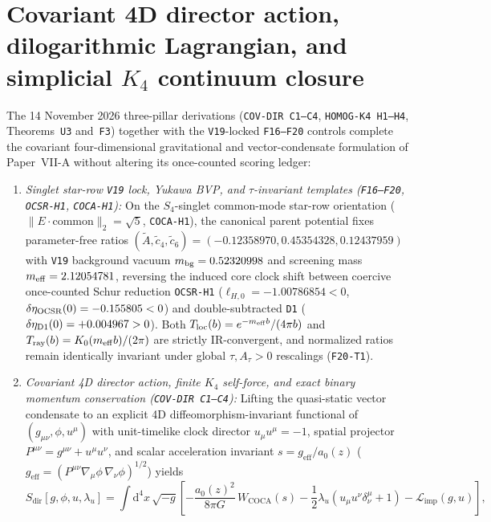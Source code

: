 \documentclass[11pt]{article}
\begin{document}
\section{Covariant 4D director action, dilogarithmic Lagrangian, and simplicial $K_4$ continuum closure}
\label{sec:foundations-f16-f20-papervii-20261112}\hypertarget{f16f20papervii}{}
The 14 November 2026 three-pillar derivations (\texttt{COV-DIR C1--C4}, \texttt{HOMOG-K4 H1--H4}, Theorems~\texttt{U3} and~\texttt{F3}) together with the \texttt{V19}-locked \texttt{F16--F20} controls complete the covariant four-dimensional gravitational and vector-condensate formulation of Paper~VII-A without altering its once-counted scoring ledger:
\begin{enumerate}
\item \emph{Singlet star-row \texttt{V19} lock, Yukawa BVP, and $\tau$-invariant templates (\texttt{F16--F20}, \texttt{OCSR-H1}, \texttt{COCA-H1}):} On the $S_4$-singlet common-mode star-row orientation ($\|E\cdot\text{common}\|_2=\sqrt{5}$, \texttt{COCA-H1}), the canonical parent potential fixes parameter-free ratios $(\tilde A,\tilde c_4,\tilde c_6)=(-0.12358970,0.45354328,0.12437959)$ with \texttt{V19} background vacuum $m_{\rm bg}=0.52320998$ and screening mass $m_{\rm eff}=2.12054781$, reversing the induced core clock shift between coercive once-counted Schur reduction \texttt{OCSR-H1} ($\ell_{H,0}=-1.00786854<0$, $\delta\eta_{\rm OCSR}(0)=-0.155805<0$) and double-subtracted \texttt{D1} ($\delta\eta_{\rm D1}(0)=+0.004967>0$). Both $T_{\rm loc}(b)=e^{-m_{\rm eff}b}/(4\pi b)$ and $T_{\rm ray}(b)=K_0(m_{\rm eff}b)/(2\pi)$ are strictly IR-convergent, and normalized ratios remain identically invariant under global $\tau,A_\tau>0$ rescalings (\texttt{F20-T1}).
\item \emph{Covariant 4D director action, finite $K_4$ self-force, and exact binary momentum conservation (\texttt{COV-DIR C1--C4}):} Lifting the quasi-static vector condensate to an explicit 4D diffeomorphism-invariant functional of $(g_{\mu\nu},\phi,u^\mu)$ with unit-timelike clock director $u_\mu u^\mu=-1$, spatial projector $P^{\mu\nu}=g^{\mu\nu}+u^\mu u^\nu$, and scalar acceleration invariant $s=g_{\mathrm{eff}}/a_0(z)$ ($g_{\mathrm{eff}}=(P^{\mu\nu}\nabla_\mu\phi\,\nabla_\nu\phi)^{1/2}$) yields
\begin{equation}
  S_{\mathrm{dir}}[g,\phi,u,\lambda_u]
  = \int\mathrm{d}^4x\,\sqrt{-g}\left[
    -\frac{a_0(z)^2}{8\pi G}\,W_{\mathrm{COCA}}(s)
    -\frac{1}{2}\lambda_u(u_\mu u^\nu\delta_\nu^\mu+1)
    -\mathcal{L}_{\mathrm{imp}}(g,u)
  \right],

\end{equation}
\end{enumerate}
\end{document}
